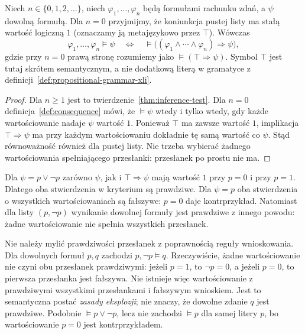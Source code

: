 \begin{twierdzenie}
\label{thm:empty-premises-consequence-lxiii}
Niech $n\in\{0,1,2,\ldots\}$, niech $\varphi_1,\ldots,\varphi_n$ będą formułami
rachunku zdań, a $\psi$ dowolną formułą. Dla $n=0$ przyjmijmy, że
koniunkcja pustej listy ma stałą wartość logiczną $1$ (oznaczamy ją
metajęzykowo przez $\top$). Wówczas
\[
\varphi_1,\ldots,\varphi_n\models\psi
\quad\Longleftrightarrow\quad
\models\bigl((\varphi_1\land\cdots\land\varphi_n)\Rightarrow\psi\bigr),
\]
gdzie przy $n=0$ prawą stronę rozumiemy jako $\models(\top\Rightarrow\psi)$.
Symbol $\top$ jest tutaj skrótem semantycznym, a nie dodatkową
literą w gramatyce z definicji~\ref{def:propositional-grammar-xli}.
\end{twierdzenie}
\begin{proof}
Dla $n\ge1$ jest to twierdzenie~\ref{thm:inference-test}.
Dla $n=0$ definicja~\ref{def:consequence} mówi, że
$\models\psi$ wtedy i tylko wtedy, gdy każde wartościowanie
nadaje $\psi$ wartość $1$. Ponieważ $\top$ ma zawsze wartość $1$,
implikacja $\top\Rightarrow\psi$ ma przy każdym wartościowaniu
dokładnie tę samą wartość co $\psi$. Stąd równoważność również
dla pustej listy. Nie trzeba wybierać żadnego wartościowania
spełniającego przesłanki: przesłanek po prostu nie ma.
\end{proof}
\begin{przyklad}
Dla $\psi=p\lor\neg p$ zarówno $\psi$, jak i
$\top\Rightarrow\psi$ mają wartość $1$ przy $p=0$
i przy $p=1$. Dlatego oba stwierdzenia w kryterium są
prawdziwe. Dla $\psi=p$ oba stwierdzenia o wszystkich
wartościowaniach są fałszywe: $p=0$ daje kontrprzykład.
Natomiast dla listy $(p,\neg p)$
wynikanie dowolnej formuły jest prawdziwe z innego powodu:
żadne wartościowanie nie spełnia wszystkich przesłanek.
\end{przyklad}

\begin{uwaga}
\label{rem:explosion-semantic-xli}
Nie należy mylić prawdziwości przesłanek
z poprawnością reguły wnioskowania. Dla dowolnych formuł
$p,q$ zachodzi $p,\neg p\models q$. Rzeczywiście,
żadne wartościowanie nie czyni obu przesłanek prawdziwymi:
jeżeli $p=1$, to $\neg p=0$, a jeżeli $p=0$, to pierwsza
przesłanka jest fałszywa. Nie istnieje więc wartościowanie
z prawdziwymi wszystkimi przesłankami i fałszywym wnioskiem.
Jest to semantyczna postać \emph{zasady eksplozji}; nie znaczy,
że dowolne zdanie $q$ jest prawdziwe. Podobnie
$\models p\lor\neg p$, lecz nie zachodzi
$\models p$ dla samej litery $p$, bo wartościowanie
$p=0$ jest kontrprzykładem.
\end{uwaga}

